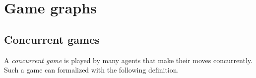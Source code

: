 \documentclass[11pt]{article}
\newcommand{\ldabrac}{\langle\!\langle}
\newcommand{\rdabrac}{\rangle\!\rangle}
\begin{document}
% 
% 
% 
% 












\section{Game graphs \label{sec.tb.gg}} 


\subsection{Concurrent games} 

A {\em concurrent game} is played by many agents 
that make their moves concurrently.  
Such a game can formalized with the following definition.  
\end{document}
